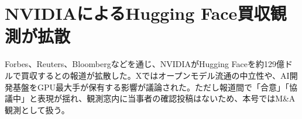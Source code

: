 \section{NVIDIAによるHugging Face買収観測が拡散}
Forbes、Reuters、Bloombergなどを通じ、NVIDIAがHugging Faceを約129億ドルで買収するとの報道が拡散した。Xではオープンモデル流通の中立性や、AI開発基盤をGPU最大手が保有する影響が議論された。ただし報道間で「合意」「協議中」と表現が揺れ、観測窓内に当事者の確認投稿はないため、本号ではM\&A観測として扱う。
